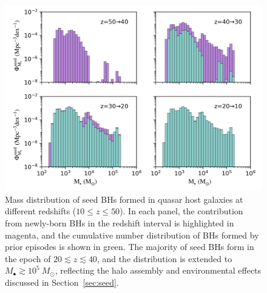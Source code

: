 \documentclass[twocolumn, twocolappendix]{aastex63}
\newcommand{\Msun}{M_\odot}
\begin{document}
\begin{CJK*}{UTF8}{gbsn}
\begin{figure}
\centering
\includegraphics[width=140mm]{seedBHMF_z.png}
\caption{
Mass distribution of seed BHs formed in quasar host galaxies at different redshifts ($10\leq z \leq 50$).
In each panel, the contribution from newly-born BHs in the redshift interval is highlighted in magenta,
and the cumulative number distribution of BHs formed by prior episodes is shown in green.
The majority of seed BHs form in the epoch of $20\lesssim z \lesssim 40$,
and the distribution is extended to $M_\bullet \gtrsim 10^5~\Msun$, 
reflecting the halo assembly and environmental effects discussed in Section~\ref{sec:seed}.
}
\label{fig:seedmf}
\vspace{5mm}
\end{figure}



\end{CJK*}
\end{document}
